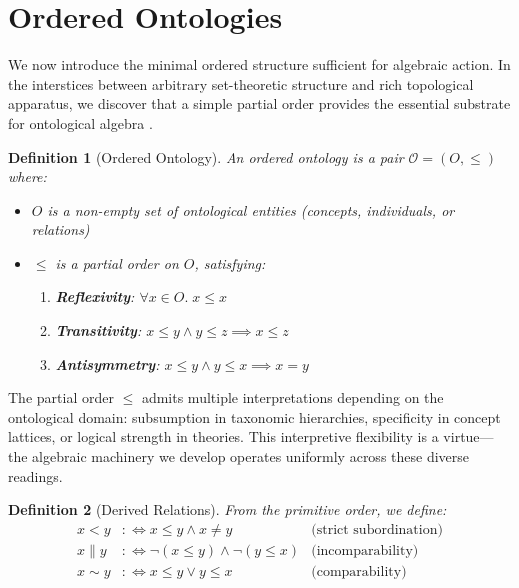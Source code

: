 \documentclass[11pt,a4paper]{article}
\newtheorem{definition}{Definition}[section]
\newcommand{\onto}{\mathcal{O}}
\begin{document}
\section{Ordered Ontologies}

We now introduce the minimal ordered structure sufficient for algebraic action. In the interstices between arbitrary set-theoretic structure and rich topological apparatus, we discover that a simple partial order provides the essential substrate for ontological algebra \citep[for foundational material on order theory, see][]{davey2002}.

\begin{definition}[Ordered Ontology]
An \emph{ordered ontology} is a pair $\onto = (O, \leq)$ where:
\begin{itemize}
    \item $O$ is a non-empty set of \emph{ontological entities} (concepts, individuals, or relations)
    \item $\leq$ is a partial order on $O$, satisfying:
    \begin{enumerate}[label=(\alph*)]
        \item \textbf{Reflexivity}: $\forall x \in O.\; x \leq x$
        \item \textbf{Transitivity}: $x \leq y \land y \leq z \implies x \leq z$
        \item \textbf{Antisymmetry}: $x \leq y \land y \leq x \implies x = y$
    \end{enumerate}
\end{itemize}
\end{definition}

The partial order $\leq$ admits multiple interpretations depending on the ontological domain: subsumption in taxonomic hierarchies, specificity in concept lattices, or logical strength in theories. This interpretive flexibility is a virtue---the algebraic machinery we develop operates uniformly across these diverse readings.

\begin{definition}[Derived Relations]
From the primitive order, we define:
\begin{align*}
    x < y &:\iff x \leq y \land x \neq y & \text{(strict subordination)}\\
    x \parallel y &:\iff \neg(x \leq y) \land \neg(y \leq x) & \text{(incomparability)}\\
    x \sim y &:\iff x \leq y \lor y \leq x & \text{(comparability)}
\end{align*}
\end{definition}
\end{document}
